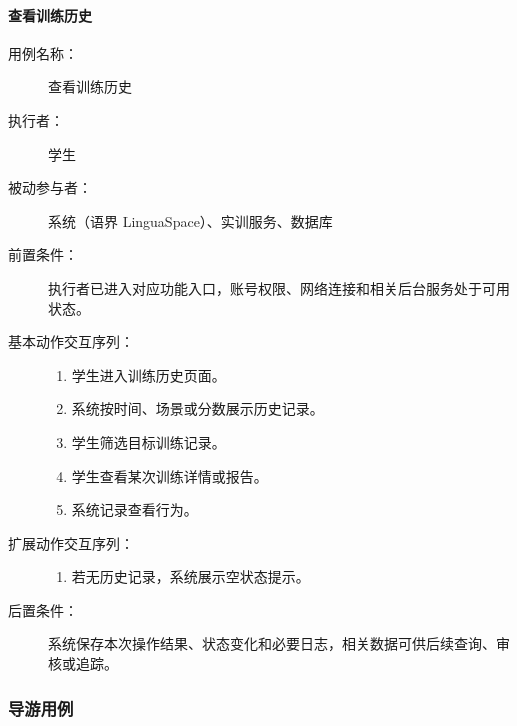 \paragraph{查看训练历史}
\begin{description}
  \item[用例名称：] 查看训练历史
  \item[执行者：] 学生
  \item[被动参与者：] 系统（语界 LinguaSpace）、实训服务、数据库
  \item[前置条件：] 执行者已进入对应功能入口，账号权限、网络连接和相关后台服务处于可用状态。
  \item[基本动作交互序列：]
  \begin{enumerate}
    \item 学生进入训练历史页面。
    \item 系统按时间、场景或分数展示历史记录。
    \item 学生筛选目标训练记录。
    \item 学生查看某次训练详情或报告。
    \item 系统记录查看行为。
  \end{enumerate}
  \item[扩展动作交互序列：]
  \begin{enumerate}
    \item[2a.] 若无历史记录，系统展示空状态提示。
  \end{enumerate}
  \item[后置条件：] 系统保存本次操作结果、状态变化和必要日志，相关数据可供后续查询、审核或追踪。
\end{description}


\subsubsection{导游用例}


